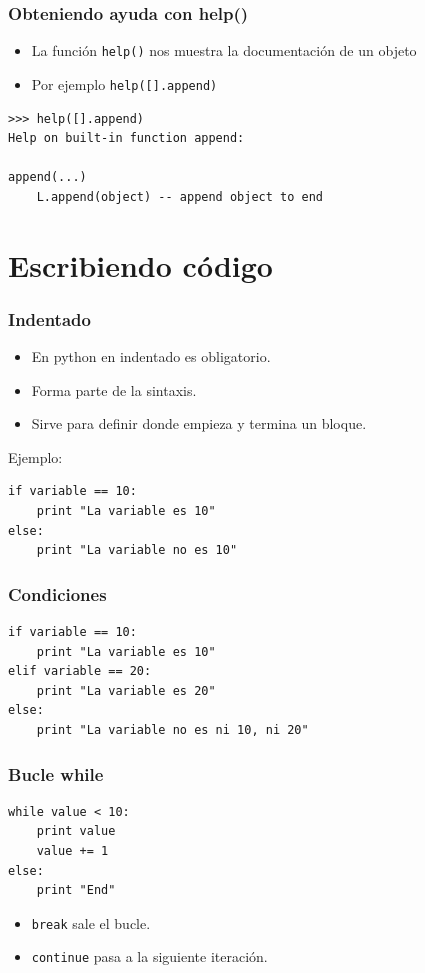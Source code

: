 \documentclass[10pt]{beamer}
\begin{document}
  \begin{frame}[containsverbatim]
    \frametitle{Obteniendo ayuda con help()}
    \begin{itemize}
      \item La función \verb+help()+ nos muestra la documentación de un objeto
      \item Por ejemplo \verb+help([].append)+
    \end{itemize}
    \begin{verbatim}
>>> help([].append)
Help on built-in function append:

append(...)
    L.append(object) -- append object to end
    \end{verbatim}
  \end{frame}

  \section*{Escribiendo código}
  \begin{frame}[containsverbatim]
    \frametitle{Indentado}
    \begin{itemize}
      \item En python en indentado es obligatorio.
      \item Forma parte de la sintaxis.
      \item Sirve para definir donde empieza y termina un bloque.
    \end{itemize}
    Ejemplo:
    \begin{verbatim}
if variable == 10:
    print "La variable es 10"
else:
    print "La variable no es 10"
    \end{verbatim}
  \end{frame}
  
  \begin{frame}[containsverbatim]
    \frametitle{Condiciones}
    \begin{verbatim}
if variable == 10:
    print "La variable es 10"
elif variable == 20:
    print "La variable es 20"
else:
    print "La variable no es ni 10, ni 20"
    \end{verbatim}
  \end{frame}

  \begin{frame}[containsverbatim]
    \frametitle{Bucle while}
    \begin{verbatim}
while value < 10:
    print value
    value += 1
else:
    print "End"
    \end{verbatim}
    \begin{itemize}
      \item \verb+break+ sale el bucle.
      \item \verb+continue+ pasa a la siguiente iteración.
    \end{itemize}
  \end{frame}
\end{document}

